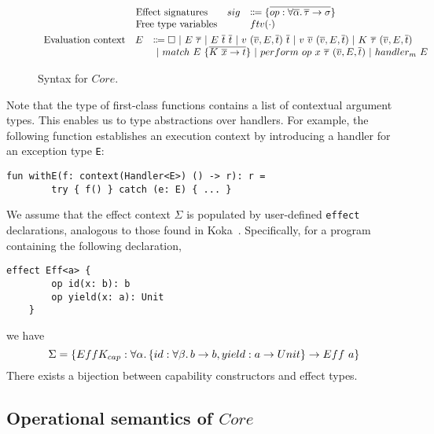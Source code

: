 \documentclass[acmsmall,review,screen]{acmart}
\newcommand{\vor}{~|~}
\newcommand{\ap}{~}
\begin{document}
\begin{figure}
\begin{gather*}
\begin{array}{lrl}
            \text{Effect signatures} & sig &\Coloneqq \{\overline{op : \forall\overline{\alpha}\ldotp\overline{\tau}\to\sigma}\} \\
            \text{Free type variables} & & ftv(\cdot) \\
        \end{array}\\
        \begin{array}{ccl}
            \text{Evaluation context} & E & \Coloneqq \square \vor E \ap \overline{\tau} \vor E \ap \overline{t}\ap \overline{t} \vor v \ap (\overline{v}, E, \overline{t}) \ap \overline{t} \vor v \ap \overline{v} \ap (\overline{v}, E, \overline{t}) \vor K\ap\overline{\tau}\ap(\overline{v}, E, \overline{t}) \\
            && \vor match\ap E\ap \{\overline{K\ap\overline{x}\to t}\} \vor perform~op~x~\overline{\tau}~(\overline{v}, E, \overline{t}) \vor handler_m ~ E
        \end{array}
    \end{gather*}
    \caption{Syntax for $Core$.}
    \label{fig:core-syntax}
\end{figure}

Note that the type of first-class functions contains a list of contextual argument types.
This enables us to type abstractions over handlers.
For example, the following function establishes an execution context by introducing a handler for an exception type \lstinline[language=colang]{E}:
\begin{lstlisting}[language=colang]
    fun withE(f: context(Handler<E>) () -> r): r =
        try { f() } catch (e: E) { ... }
\end{lstlisting}

We assume that the effect context $\Sigma$ is populated by user-defined \lstinline[language=colang]{effect} declarations, analogous to those found in Koka~\cite{leijen2017type}.
Specifically, for a program containing the following declaration,
\begin{lstlisting}[language=colang]
    effect Eff<a> {
        op id(x: b): b
        op yield(x: a): Unit
    }
\end{lstlisting}
we have \[\Sigma = \{EffK_{cap} : \forall\alpha\ldotp\{id : \forall\beta\ldotp b\to b, yield : a \to Unit\} \to Eff\ap a\}\]
There exists a bijection between capability constructors and effect types.

\subsection{Operational semantics of $Core$} \label{subsec:core-operational}
\end{document}
